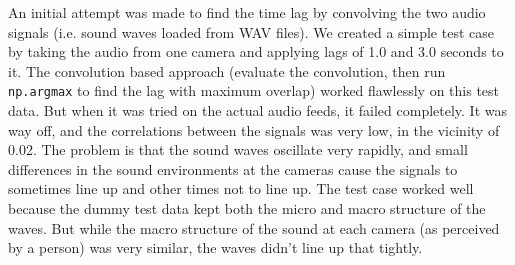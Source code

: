 \documentclass{article}
\begin{document}
An initial attempt was made to find the time lag by convolving the two audio signals 
(i.e. sound waves loaded from WAV files).  
We created a simple test case by taking the audio from one camera and applying lags of 1.0 and 3.0 seconds to it.
The convolution based approach (evaluate the convolution, then run \texttt{np.argmax} to find the lag with maximum overlap)
worked flawlessly on this test data.  But when it was tried on the actual audio feeds, it failed completely.  
It was way off, and the correlations between the signals was very low, in the vicinity of 0.02.
The problem is that the sound waves oscillate very rapidly, and small differences in the sound environments
at the cameras cause the signals to sometimes line up and other times not to line up.
The test case worked well because the dummy test data kept both the micro and macro structure of the waves.
But while the macro structure of the sound at each camera (as perceived by a person) was very similar,
the waves didn't line up that tightly.
\end{document}
